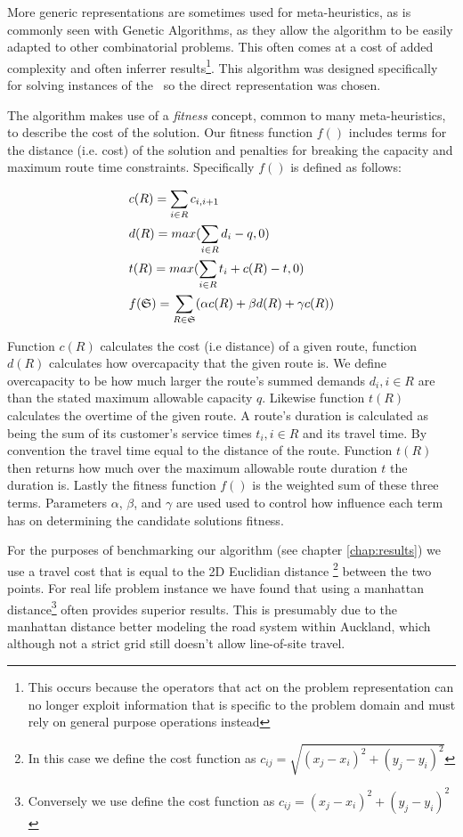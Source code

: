 
More generic representations are sometimes used for meta-heuristics, as is commonly seen with Genetic Algorithms, as they allow the algorithm to be easily adapted to other combinatorial problems. This often comes at a cost of added complexity and often inferrer results\footnote{This occurs because the operators that act on the problem representation can no longer exploit information that is specific to the problem domain and must rely on general purpose operations instead}. This algorithm was designed specifically for solving instances of the \VRP\ so the direct representation was chosen. 

The algorithm makes use of a \emph{fitness} concept, common to many meta-heuristics, to describe the cost of the solution. Our fitness function $f()$ includes terms for the distance (i.e. cost) of the solution and penalties for breaking the capacity and maximum route time constraints. Specifically $f()$ is defined as follows:

\begin{align}
   & c(R) = \sum_{i \in R} c_{i, i+1} \\
   & d(R) = max( \sum_{i \in R} d_i - q, 0 )  \\
   & t(R) = max( \sum_{i \in R} t_i + c(R) - t, 0 )  \\
   & f(\mathfrak{S}) = \sum_{R \in \mathfrak{S}} (\alpha c(R) + \beta d(R) + \gamma c(R))
\end{align}

Function $c(R)$ calculates the cost (i.e distance) of a given route, function $d(R)$ calculates how overcapacity that the given route is. We define overcapacity to be how much larger the route's summed demands $d_i, i \in R$ are than the stated maximum allowable capacity $q$. Likewise function $t(R)$ calculates the overtime of the given route. A route's duration is calculated as being the sum of its customer's service times $t_i, i \in R$ and its travel time. By convention the travel time equal to the distance of the route. Function $t(R)$ then returns how much over the maximum allowable route duration $t$ the duration is. Lastly the fitness function $f()$ is the weighted sum of these three terms. Parameters $\alpha$, $\beta$, and $\gamma$ are used  used to control how influence each term has on determining the candidate solutions fitness.

For the purposes of benchmarking our algorithm (see chapter \ref{chap:results}) we use a travel cost that is equal to the 2D Euclidian distance \footnote{In this case we define the cost function as $c_{ij} = \sqrt{(x_j-x_i)^2 + (y_j-y_i)^2}$} between the two points. For real life problem instance we have found that using a manhattan distance\footnote{Conversely we use define the cost function as $c_{ij} = (x_j-x_i)^2 + (y_j-y_i)^2$} often provides superior results. This is presumably due to the manhattan distance better modeling the road system within Auckland, which although not a strict grid still doesn't allow line-of-site travel.

